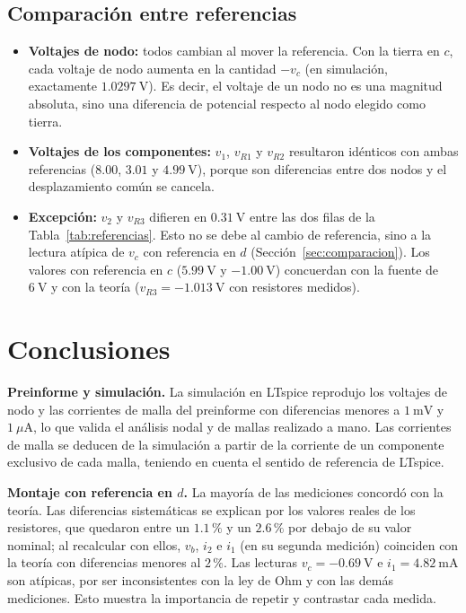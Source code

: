 \documentclass[conference,10pt]{IEEEtran}
\begin{document}
\subsection{Comparación entre referencias}
\begin{itemize}
  \item \textbf{Voltajes de nodo:} todos cambian al mover la referencia. Con la tierra en $c$, cada voltaje de nodo aumenta en la cantidad $-v_c$ (en simulación, exactamente $1.0297~\mathrm{V}$). Es decir, el voltaje de un nodo no es una magnitud absoluta, sino una diferencia de potencial respecto al nodo elegido como tierra.
  \item \textbf{Voltajes de los componentes:} $v_1$, $v_{R1}$ y $v_{R2}$ resultaron idénticos con ambas referencias ($8.00$, $3.01$ y $4.99~\mathrm{V}$), porque son diferencias entre dos nodos y el desplazamiento común se cancela.
  \item \textbf{Excepción:} $v_2$ y $v_{R3}$ difieren en $0.31~\mathrm{V}$ entre las dos filas de la Tabla~\ref{tab:referencias}. Esto no se debe al cambio de referencia, sino a la lectura atípica de $v_c$ con referencia en $d$ (Sección~\ref{sec:comparacion}). Los valores con referencia en $c$ ($5.99~\mathrm{V}$ y $-1.00~\mathrm{V}$) concuerdan con la fuente de $6~\mathrm{V}$ y con la teoría ($v_{R3}=-1.013~\mathrm{V}$ con resistores medidos).
\end{itemize}

\section{Conclusiones}
\textbf{Preinforme y simulación.} La simulación en LTspice reprodujo los voltajes de nodo y las corrientes de malla del preinforme con diferencias menores a $1~\mathrm{mV}$ y $1~\mu\mathrm{A}$, lo que valida el análisis nodal y de mallas realizado a mano. Las corrientes de malla se deducen de la simulación a partir de la corriente de un componente exclusivo de cada malla, teniendo en cuenta el sentido de referencia de LTspice.

\textbf{Montaje con referencia en $d$.} La mayoría de las mediciones concordó con la teoría. Las diferencias sistemáticas se explican por los valores reales de los resistores, que quedaron entre un $1.1\,\%$ y un $2.6\,\%$ por debajo de su valor nominal; al recalcular con ellos, $v_b$, $i_2$ e $i_1$ (en su segunda medición) coinciden con la teoría con diferencias menores al $2\,\%$. Las lecturas $v_c=-0.69~\mathrm{V}$ e $i_1=4.82~\mathrm{mA}$ son atípicas, por ser inconsistentes con la ley de Ohm y con las demás mediciones. Esto muestra la importancia de repetir y contrastar cada medida.
\end{document}

